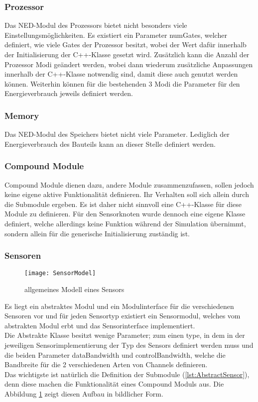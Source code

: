 \subsubsection{Prozessor}

Das NED-Modul des Prozessors bietet nicht besonders viele Einstellungsmöglichkeiten. Es existiert ein Parameter numGates, welcher definiert, wie viele Gates der Prozessor besitzt, wobei der Wert dafür innerhalb der Initialisierung der C++-Klasse gesetzt wird. Zusätzlich kann die Anzahl der Prozessor Modi geändert werden, wobei dann wiederum zusätzliche Anpassungen innerhalb der C++-Klasse notwendig sind, damit diese auch genutzt werden können. Weiterhin können für die bestehenden 3 Modi die Parameter für den Energieverbrauch jeweils definiert werden.

\subsubsection{Memory}

Das NED-Modul des Speichers bietet nicht viele Parameter. Lediglich der Energieverbrauch des Bauteils kann an dieser Stelle definiert werden.

\subsubsection{Compound Module}

Compound Module dienen dazu, andere Module zusammenzufassen, sollen jedoch keine eigene aktive Funktionalität definieren. Ihr Verhalten soll sich allein durch die Submodule ergeben. Es ist daher nicht sinnvoll eine C++-Klasse für diese Module zu definieren.\newline
Für den Sensorknoten wurde dennoch eine eigene Klasse definiert, welche allerdings keine Funktion während der Simulation übernimmt, sondern allein für die generische Initialisierung zuständig ist.

\subsubsection{Sensoren}

\begin{figure}[htbp]
\centering
\caption{allgemeines Modell eines Sensors}
\label{fig:SensorModel}
\texttt{[image: SensorModel]}
\end{figure}

Es liegt ein abstraktes Modul und ein Modulinterface für die verschiedenen Sensoren vor und für jeden Sensortyp existiert ein Sensormodul, welches vom abstrakten Modul erbt und das Sensorinterface implementiert.\\
Die Abstrakte Klasse besitzt wenige Parameter; zum einen type, in dem in der jeweiligen Sensorimplementierung der Typ des Sensors definiert werden muss und die beiden Parameter dataBandwidth und controlBandwidth, welche die Bandbreite für die 2 verschiedenen Arten von Channels definieren.\\
Das wichtigste ist natürlich die Definition der Submodule (\ref{lst:AbstractSensor}), denn diese machen die Funktionalität eines Compound Moduls aus. Die Abbildung \ref{fig:SensorModel} zeigt diesen Aufbau in bildlicher Form.

